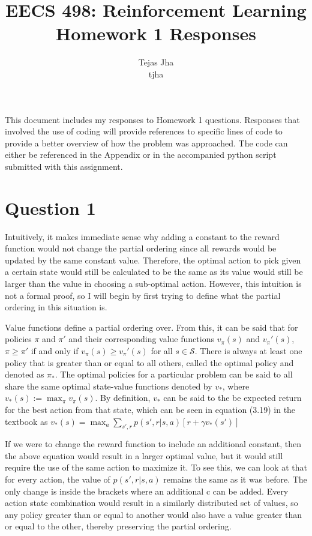\documentclass[11pt]{article}
\title{EECS 498: Reinforcement Learning \protect \\ Homework 1 Responses}
\author{Tejas Jha \\ tjha}
\begin{document}
\maketitle
This document includes my responses to Homework 1 questions. Responses that involved the use of coding will provide references to specific lines of code to provide a better overview of how the problem was approached. The code can either be referenced in the Appendix or in the accompanied python script submitted with this assignment.

\section*{Question 1}
Intuitively, it makes immediate sense why adding a constant to the reward function would not change the partial ordering since all rewards would be updated by the same constant value. Therefore, the optimal action to pick given a certain state would still be calculated to be the same as its value would still be larger than the value in choosing a sub-optimal action. However, this intuition is not a formal proof, so I will begin by first trying to define what the partial ordering in this situation is.

Value functions define a partial ordering over. From this, it can be said that for policies $\pi$ and $\pi\prime$ and their corresponding value functions $v_\pi(s)$ and $v_\pi\prime(s)$, $\pi \geq \pi\prime$ if and only if $v_\pi(s) \geq v_\pi\prime(s)$ for all $ s \in \mathcal{S}$. There is always at least one policy that is greater than or equal to all others, called the optimal policy and denoted as $\pi_*$. The optimal policies for a particular problem can be said to all share the same optimal state-value functions denoted by $v_*$, where $v_*(s) := \max_{\pi}v_\pi(s)$. By definition, $v_*$ can be said to the be expected return for the best action from that state, which can be seen in equation (3.19) in the textbook as  $v_*(s) = \max_{a}\sum_{s\prime, r}p(s\prime,r|s,a)[r + \gamma v_*(s\prime)] $

If we were to change the reward function to include an additional constant, then the above equation would result in a larger optimal value, but it would still require the use of the same action to maximize it. To see this, we can look at that for every action, the value of $p(s\prime,r|s,a)$ remains the same as it was before. The only change is inside the brackets where an additional c can be added. Every action state combination would result in a similarly distributed set of values, so any policy greater than or equal to another would also have a value greater than or equal to the other, thereby preserving the partial ordering.
\end{document}

